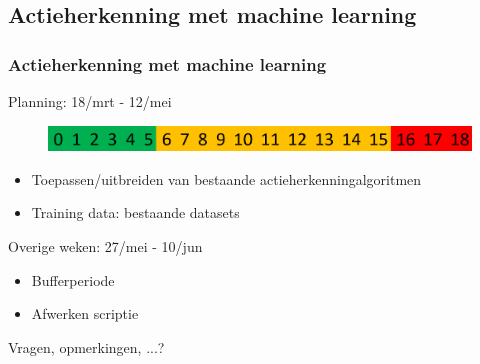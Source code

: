 \documentclass[handout]{beamer}
\begin{document}
	\subsection{Actieherkenning met machine learning}
		\begin{frame}
		\frametitle{Actieherkenning met machine learning}
		Planning: 18/mrt - 12/mei
		\begin{figure}
		\includegraphics[width=\textwidth]{actieherkenning}
		\end{figure}
		\begin{itemize}
			\item<1- > Toepassen/uitbreiden van bestaande actieherkenningalgoritmen
			\item<2- > Training data: bestaande datasets
		\end{itemize}
	\end{frame}
	
	\begin{frame}
	Overige weken: 27/mei - 10/jun
	\begin{itemize}
	\item Bufferperiode
	\item Afwerken scriptie
	\end{itemize}
	\end{frame}
	
	\begin{frame}
		\begin{center}
			\Huge Vragen, opmerkingen, ...?
		\end{center}
	\end{frame}
\end{document}
